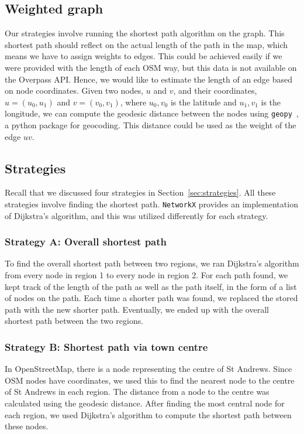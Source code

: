 \documentclass[12pt,a4paper]{report}
\begin{document}
\subsection{Weighted graph}
Our strategies involve running the shortest path algorithm on the graph. This shortest path should reflect on the actual length of the path in the map, which means we have to assign weights to edges. This could be achieved easily if we were provided with the length of each OSM way, but this data is not available on the Overpass API. Hence, we would like to estimate the length of an edge based on node coordinates. Given two nodes, $u$ and $v$, and their coordinates, $u = (u_0, u_1)$ and $v = (v_0, v_1)$, where $u_0, v_0$ is the latitude and $u_1, v_1$ is the longitude, we can compute the geodesic distance between the nodes using \texttt{geopy}~\cite{geopy}, a python package for geocoding. This distance could be used as the weight of the edge $uv$.

\subsection{Strategies}
Recall that we discussed four strategies in Section~\ref{sec:strategies}. All these strategies involve finding the shortest path. \texttt{NetworkX} provides an implementation of Dijkstra's algorithm, and this was utilized differently for each strategy. 

\subsubsection*{Strategy A: Overall shortest path}
To find the overall shortest path between two regions, we ran Dijkstra's algorithm from every node in region 1 to every node in region 2. For each path found, we kept track of the length of the path as well as the path itself, in the form of a list of nodes on the path. Each time a shorter path was found, we replaced the stored path with the new shorter path. Eventually, we ended up with the overall shortest path between the two regions.

\subsubsection*{Strategy B: Shortest path via town centre}
In OpenStreetMap, there is a node representing the centre of St Andrews. Since OSM nodes have coordinates, we used this to find the nearest node to the centre of St Andrews in each region. The distance from a node to the centre was calculated using the geodesic distance. After finding the most central node for each region, we used Dijkstra's algorithm to compute the shortest path between these nodes.
\end{document}
